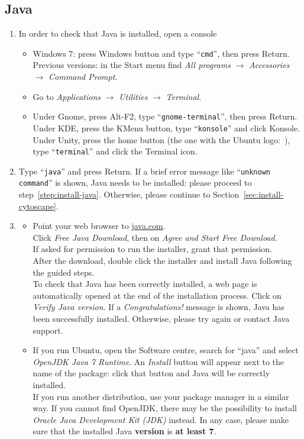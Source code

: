 \documentclass{article}
\newcommand{\winsymbol}{\raisebox{-0.8ex}{\pgfuseimage{win-logo}}}
\newcommand{\macsymbol}{\raisebox{-0.5ex}{\pgfuseimage{mac-logo}}}
\newcommand{\linuxsymbol}{\raisebox{-0.8ex}{\pgfuseimage{linux-logo}}}
\newcommand{\ubuntusymbol}{\raisebox{-0.9ex}{\pgfuseimage{ubuntu-logo}}}
\newcommand{\winmaclinux}[3]{\begin{itemize}
    \item[\winsymbol] #1
    \item[\macsymbol] #2
    \item[\linuxsymbol] #3
\end{itemize}}
\newcommand{\winandmacorlinux}[2]{\begin{itemize}
    \item[\winsymbol\ \  \macsymbol] #1
    \item[\linuxsymbol] #2
\end{itemize}}
\begin{document}
\subsection{Java}\label{sec:install-java}
\begin{enumerate}
\item\label{step:open-console} In order to check that Java is installed, open a console
\winmaclinux{Windows 7: press Windows button and type ``{\tt cmd}'', then press Return. Previous versions: in the Start
menu find \emph{All programs} $\rightarrow$ \emph{Accessories} $\rightarrow$ \emph{Command Prompt}.}%
{Go to \emph{Applications} $\rightarrow$ \emph{Utilities} $\rightarrow$ \emph{Terminal}.}%
{Under Gnome, press Alt-F2, type ``{\tt gnome-terminal}'', then press Return. Under KDE, press the KMenu button, type
``{\tt konsole}'' and click Konsole. Under Unity, press the home button (the one with the Ubuntu
logo:~\ubuntusymbol), type ``{\tt terminal}'' and click the Terminal icon.}
\item Type ``{\tt java}'' and press Return. If a brief error message like ``{\tt unknown command}'' is shown, Java needs to be
installed: please proceed to step~\ref{step:install-java}. Otherwise, please continue to Section~\ref{sec:install-cytoscape}.
\item\label{step:install-java}
\winandmacorlinux{Point your web browser to \url{java.com}.\\
Click \emph{Free Java Download}, then on \emph{Agree and Start Free Download}.\\
If asked for permission to run the installer, grant that permission.\\
After the download, double click the installer and install Java following the guided steps.\\
To check that Java has been correctly installed, a web page is automatically opened at
the end of the installation process. Click on \emph{Verify Java version}. If a \emph{Congratulations!} message is shown,
Java has been successfully installed. Otherwise, please try again or contact Java support.}%
{If you run Ubuntu, open the Software centre, search for ``java'' and select \emph{OpenJDK Java 7 Runtime}. An
\emph{Install} button
will appear next to the name of the package: click that button and Java will be correctly installed.\\
If you run another distribution, use your package manager in a similar way. If you cannot find OpenJDK, there may be
the possibility to install \emph{Oracle Java Development Kit (JDK)} instead. In any case, please make sure that the
installed Java {\bf version} is {\bf at least 7}.}
\end{enumerate}
\end{document}
